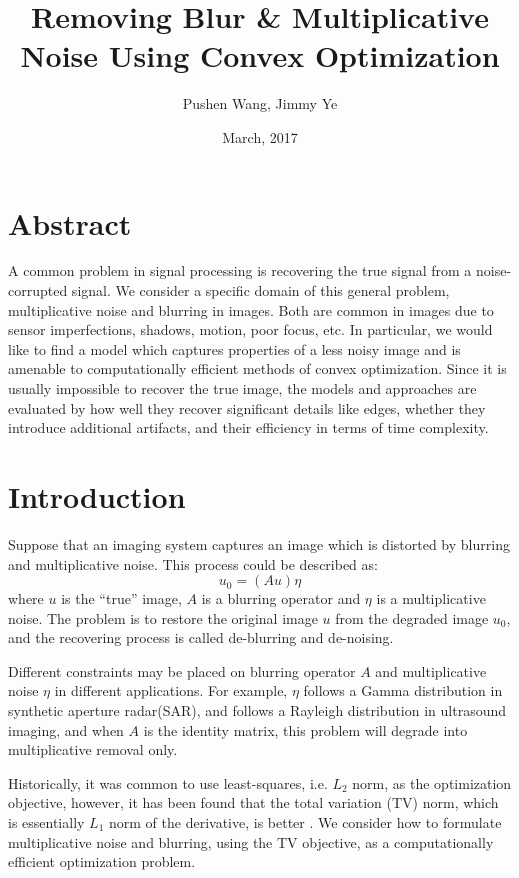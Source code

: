 \documentclass[11pt, oneside]{article}   	%
\title{Removing Blur \& Multiplicative Noise Using Convex Optimization}
\author{Pushen Wang, Jimmy Ye}
\date{March, 2017}							%
\begin{document}
\maketitle

\section{Abstract}

A common problem in signal processing is recovering the true signal from a
noise-corrupted signal. We consider a specific domain of this general problem,
multiplicative noise and blurring in images. Both are common in images due to
sensor imperfections, shadows, motion, poor focus, etc. In particular, we would
like to find a model which captures properties of a less noisy image and is
amenable to computationally efficient methods of convex optimization. Since it
is usually impossible to recover the true image, the models and approaches are
evaluated by how well they recover significant details like edges, whether they
introduce additional artifacts, and their efficiency in terms of time
complexity.

\section{Introduction}

Suppose that an imaging system captures an image which is distorted by blurring
and multiplicative noise. This process could be described as:
\begin{equation} \label{eqn:formulation}
u_0 = (Au)\eta
\end{equation}
where $u$ is the ``true'' image, $A$ is a blurring operator and $\eta$ is a
multiplicative noise. The problem is to restore the original image $u$ from the
degraded image $u_0$, and the recovering process is called de-blurring
and de-noising.

Different constraints may be placed on blurring operator $A$ and multiplicative
noise $\eta$ in different applications. For example, $\eta$ follows a Gamma
distribution in synthetic aperture radar(SAR), and follows a Rayleigh
distribution in ultrasound imaging, and when $A$ is the identity matrix, this
problem will degrade into multiplicative removal only.

Historically, it was common to use least-squares, i.e. $L_2$ norm, as the
optimization objective, however, it has been found that the total variation (TV)
norm, which is essentially $L_1$ norm of the derivative, is better \cite{rudin1992}.
We consider how to formulate multiplicative noise and blurring, using the TV
objective, as a computationally efficient optimization problem.
\end{document}
